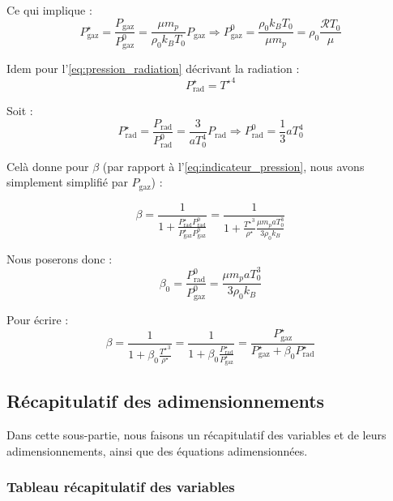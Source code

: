Ce qui implique :
\begin{equation}
    P_\mathrm{gaz}^\star = \frac{P_\mathrm{gaz}}{P_\mathrm{gaz}^0} = \frac{\mu m_p}{\rho_0 k_B T_0} P_\mathrm{gaz} \Rightarrow P_\mathrm{gaz}^0 = \frac{\rho_0 k_B T_0}{\mu m_p} = \rho_0 \frac{\mathcal{R} T_0}{\mu}
\end{equation}

Idem pour l’\cref{eq:pression_radiation} décrivant la radiation :
\begin{equation}
    P_\mathrm{rad}^\star = {T^\star}^4
\end{equation}

Soit :
\begin{equation}
    P_\mathrm{rad}^\star = \frac{P_\mathrm{rad}}{P_\mathrm{rad}^0} = \frac{3}{a T_0^4} P_\mathrm{rad} \Rightarrow P_\mathrm{rad}^0 = \frac{1}{3} a T_0^4
\end{equation}

Celà donne pour $\beta$ (par rapport à l’\cref{eq:indicateur_pression}, nous
avons simplement simplifié par $P_\mathrm{gaz}$) :

\begin{equation}
    \beta = \frac{1}{1 + \frac{P_\mathrm{rad}^\star P_\mathrm{rad}^0}{P_\mathrm{gaz}^\star P_\mathrm{gaz}^0}} = \frac{1}{1 + \frac{{T^\star}^3}{\rho^\star} \frac{\mu m_p a T_0^3}{3 \rho_0 k_B}}
\end{equation}

Nous poserons donc :
\begin{equation}
    \beta_0 = \frac{P_\mathrm{rad}^0}{P_\mathrm{gaz}^0} = \frac{\mu m_p a T_0^3}{3 \rho_0 k_B}
\end{equation}

Pour écrire :
\begin{equation}
    \beta = \frac{1}{1 + \beta_0 \frac{{T^\star}^3}{\rho^\star}} = \frac{1}{1 + \beta_0 \frac{P_\mathrm{rad}^\star}{P_\mathrm{gaz}^\star}} = \frac{P_\mathrm{gaz}^\star}{P_\mathrm{gaz}^\star + \beta_0 P_\mathrm{rad}^\star}
\end{equation}

\subsection{Récapitulatif des adimensionnements}

Dans cette sous-partie, nous faisons un récapitulatif des variables et de leurs
adimensionnements, ainsi que des équations adimensionnées.

\subsubsection{Tableau récapitulatif des variables}

